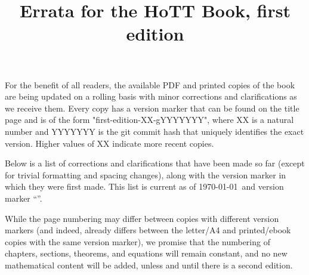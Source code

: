 \documentclass[
%
%
11pt %
]{article}
\title{Errata for the HoTT Book, first edition%
}
\newcounter{chapter}            %
\begin{document}
\maketitle

For the benefit of all readers, the available PDF and printed copies of the book are being updated on a rolling basis with minor corrections and clarifications as we receive them. Every copy has a version marker that can be found on the title page and is of the form "first-edition-XX-gYYYYYYY", where XX is a natural number and YYYYYYY is the git commit hash that uniquely identifies the exact version. Higher values of XX indicate more recent copies.

Below is a list of corrections and clarifications that have been made
so far
(except for trivial formatting and spacing changes), along with the version marker in which they were first made.
This list is current as of \today\ and version marker ``\OPTversion''.

While the page numbering may differ between copies with different version markers (and indeed, already differs between the letter/A4 and printed/ebook copies with the same version marker), we promise that the numbering of chapters, sections, theorems, and equations will remain constant, and no new mathematical content will be added, unless and until there is a second edition.
\end{document}
